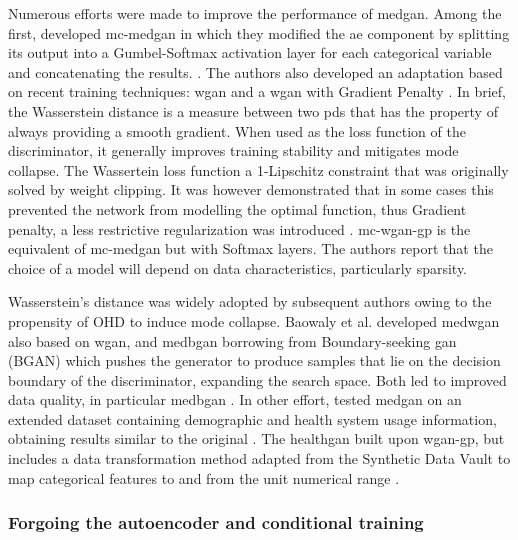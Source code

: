             Numerous efforts were made to improve the performance of \gls{medgan}. Among the first, \citeauthor{Camino2018-re} developed \gls{mc-medgan} in which they modified the \gls{ae} component by splitting its output into a Gumbel-Softmax \cite{jang2016categorical} activation layer for each categorical variable and concatenating the results. \cite{Camino2018-re}. The authors also developed an adaptation based on recent training techniques: \gls{wgan} \cite{arjovsky2017wasserstein} and a \gls{wgan} with Gradient Penalty \cite{gulrajani2017improved}. In brief, the Wasserstein distance is a measure between two \glspl{pd} that has the property of always providing a smooth gradient. When used as the loss function of the discriminator, it generally improves training stability and mitigates mode collapse. The Wassertein loss function a 1-Lipschitz constraint that was originally solved by weight clipping. It was however demonstrated that in some cases this prevented the network from modelling the optimal function, thus Gradient penalty, a less restrictive regularization was introduced \cite{Petzka2018}. \gls{mc-wgan-gp} is the equivalent of \gls{mc-medgan} but with Softmax layers. The authors report that the choice of a model will depend on data characteristics, particularly sparsity.\par
            
            Wasserstein's distance was widely adopted by subsequent authors owing to the propensity of OHD to induce mode collapse. Baowaly et al. developed \gls{medwgan} also based on \gls{wgan}, and \gls{medbgan} borrowing from Boundary-seeking \gls{gan} (BGAN) \cite{hjelm2017boundaryseeking} which pushes the generator to produce samples that lie on the decision boundary of the discriminator, expanding the search space. Both led to improved data quality, in particular \gls{medbgan} \cite{baowaly_2019_IEEE,baowaly_2019_jamia}. In other effort, \citeauthor{Jackson_2019} tested \gls{medgan} on an extended dataset containing demographic and health system usage information, obtaining results similar to the original \cite{Jackson_2019}. The \gls{healthgan} built upon \gls{wgan-gp}, but includes a data transformation method adapted from the Synthetic Data Vault \cite{Patki_2016} to map categorical features to and from the unit numerical range \cite{Yale_2020}. 
        
        \subsubsection{Forgoing the autoencoder and conditional training}\label{noauto}

